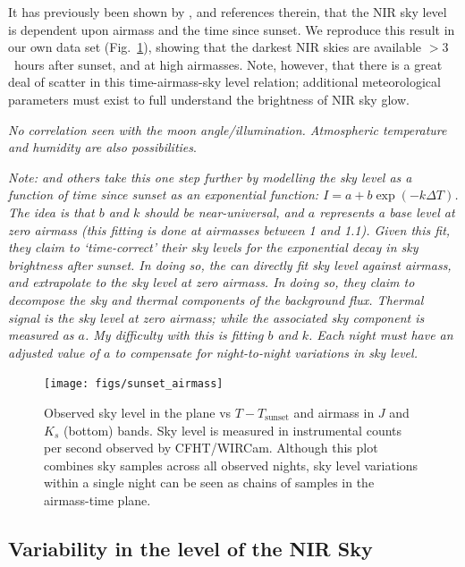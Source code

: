 \documentclass[iop]{emulateapj}
\newcommand{\mycomment}[1]{\textcolor{OliveGreen}{\textit{#1}}} %
\newcommand{\Fig}[1]{Fig.~\ref{fig:#1}}  %
\begin{document}
It has previously been shown by \cite{Vaduvescu:2004}, and references therein, that the NIR sky level is dependent upon airmass and the time since sunset.
We reproduce this result in our own data set (\Fig{skylevel_airmass_sunset}), showing that the darkest NIR skies are available $> 3$~hours after sunset, and at high airmasses.
Note, however, that there is a great deal of scatter in this time-airmass-sky level relation; additional meteorological parameters must exist to full understand the brightness of NIR sky glow.

\mycomment{No correlation seen with the moon angle/illumination. Atmospheric temperature and humidity are also possibilities}.

\mycomment{Note: \cite{Vaduvescu:2004} and others take this one step further by modelling the sky level as a function of time since sunset as an exponential function: $I = a +b \exp(- k\Delta T)$.
The \emph{idea} is that $b$ and $k$ should be near-universal, and $a$ represents a base level at zero airmass (this fitting is done at airmasses between 1 and 1.1).
Given this fit, they claim to `time-correct' their sky levels for the exponential decay in sky brightness after sunset.
In doing so, the can directly fit sky level against airmass, and extrapolate to the sky level at zero airmass.
In doing so, they claim to decompose the sky and thermal components of the background flux.
Thermal signal is the sky level at zero airmass; while the associated sky component is measured as $a$.
My difficulty with this is fitting $b$ and $k$.
Each night must have an adjusted value of $a$ to compensate for night-to-night variations in sky level.}

\begin{figure}[t]
\centering
\texttt{[image: figs/sunset\_airmass]}
\caption{Observed sky level in the plane vs $T-T_\mathrm{sunset}$ and airmass in $J$ and $K_s$ (bottom) bands. Sky level is measured in instrumental counts per second observed by CFHT/WIRCam.
Although this plot combines sky samples across all observed nights, sky level variations within a single night can be seen as chains of samples in the airmass-time plane.}
\label{fig:skylevel_airmass_sunset}
\end{figure}

\subsection{Variability in the level of the NIR Sky}
\label{sec:skylevelvariability}
\end{document}
